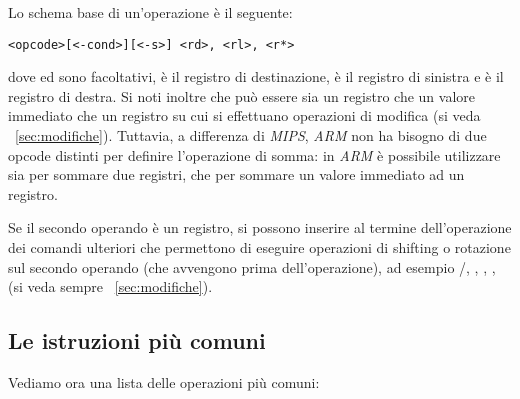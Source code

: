 \documentclass[class=book, crop=false, oneside]{standalone}
\begin{document}
Lo schema base di un'operazione è il seguente:
\begin{center}
	\texttt{<opcode>[<-cond>][<-s>] <rd>, <rl>, <r*>}
\end{center}
dove  ed  sono facoltativi,  è il registro di destinazione,  è il registro di sinistra e  è il registro di destra. Si noti inoltre che  può essere sia un registro che un valore immediato che un registro su cui si effettuano operazioni di modifica (si veda ~\ref{sec:modifiche}). Tuttavia, a differenza di \emph{MIPS}, \emph{ARM} non ha bisogno di due opcode distinti per definire l'operazione di somma: in \emph{ARM} è possibile utilizzare  sia per sommare due registri, che per sommare un valore immediato ad un registro.

Se il secondo operando è un registro, si possono inserire al termine dell'operazione dei comandi ulteriori che permettono di eseguire operazioni di shifting o rotazione sul secondo operando (che avvengono prima dell'operazione), ad esempio /, , , ,  (si veda sempre ~\ref{sec:modifiche}).

\subsection*{Le istruzioni più comuni}
Vediamo ora una lista delle operazioni più comuni:
\end{document}
